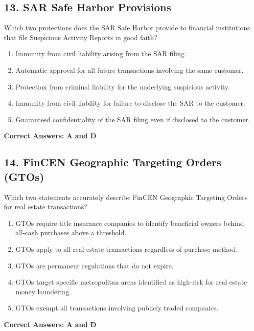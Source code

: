 \documentclass[11pt,a4paper]{article}
\begin{document}
	\subsection{13. SAR Safe Harbor Provisions}
	Which two protections does the SAR Safe Harbor provide to financial institutions that file Suspicious Activity Reports in good faith?
	\begin{enumerate}[label=\Alph*.]
		\item Immunity from civil liability arising from the SAR filing.
		\item Automatic approval for all future transactions involving the same customer.
		\item Protection from criminal liability for the underlying suspicious activity.
		\item Immunity from civil liability for failure to disclose the SAR to the customer.
		\item Guaranteed confidentiality of the SAR filing even if disclosed to the customer.
	\end{enumerate}
	\textbf{Correct Answers: A and D}
	
	\subsection{14. FinCEN Geographic Targeting Orders (GTOs)}
	Which two statements accurately describe FinCEN Geographic Targeting Orders for real estate transactions?
	\begin{enumerate}[label=\Alph*.]
		\item GTOs require title insurance companies to identify beneficial owners behind all-cash purchases above a threshold.
		\item GTOs apply to all real estate transactions regardless of purchase method.
		\item GTOs are permanent regulations that do not expire.
		\item GTOs target specific metropolitan areas identified as high-risk for real estate money laundering.
		\item GTOs exempt all transactions involving publicly traded companies.
	\end{enumerate}
	\textbf{Correct Answers: A and D}
	
\end{document}
